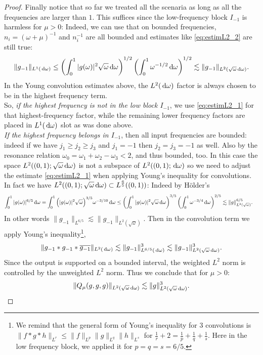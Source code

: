 \documentclass[reqno,11pt,letterpaper]{amsart}
\numberwithin{equation}{section}
\newcommand{\dd}{\, {\rm d}}
\begin{document}
\begin{proof}
Finally notice that so far we treated all the scenaria as long as all the frequencies are larger than $1$. This suffices since the low-frequency block $I_{-1}$ is harmless for $\mu>0$: Indeed, we can use that on bounded frequencies, $n_i=(\omega+\mu)^{-1}$ and $n_i^{-1}$ are all bounded and estimates like \eqref{eq:estimL2_2} are still true: 
$$
\|g_{-1}\|_{L^1(\dd\omega)} \leq \left(\int_0^1 |g(\omega)|^2\sqrt{\omega} \dd \omega\right)^{1/2}
\left(\int_0^1 \omega^{-1/2} \dd\omega\right)^{1/2}
\lesssim
\|g_{-1}\|_{L^2(\sqrt{\omega}\dd\omega)}.
$$
In the Young convolution estimates above, the $L^2(\dd\omega)$ factor is always chosen to be in the highest frequency term.\\
So, \emph{if the highest frequency is not in the low block $I_{-1}$}, we use
\eqref{eq:estimL2_1} for that highest-frequency factor, 
while the remaining lower frequency factors are placed in $L^1(\dd\omega)$ slot as was done above. \\

\emph{If the highest frequency belongs in $I_{-1}$}, then all input frequencies are bounded: indeed
 if we have $j_1\geq j_2\geq j_3$ and $j_1=-1$ then $j_2= j_3=-1$ as well. Also by the resonance relation $\omega_0= \omega_1+\omega_2-\omega_3<2$, and thus bounded, too.
 In this case the space  $L^2((0,1);\sqrt{\omega}\dd\omega)$ is not a subspace of $L^2((0,1);\dd\omega)$ so we need to adjust the estimate \eqref{eq:estimL2_1} when applying Young's inequality for convolutions.
In fact we have $L^2((0,1);\sqrt{\omega}\dd\omega) \subset L^{\frac{6}{5}}((0,1))$: Indeed by H\"{o}lder's  
\begin{align*}
\int_0^1 |g(\omega)|^{6/5}\dd\omega =\int_0^1 \Big(|g(\omega)|^2\sqrt{\omega} \Big)^{3/5}\omega^{-3/10}\dd\omega & \leq \left(\int_0^1|g(\omega)|^2\sqrt{\omega}\dd\omega\right)^{3/5}
\left(\int_0^1\omega^{-3/4}\dd\omega\right)^{2/5} \lesssim \|g\|_{L^2(\sqrt{\omega})}^{6/5}.
\end{align*} 
In other words $\|g_{-1}\|_{L^{6/5}} \lesssim \|g_{-1}\|_{L^2(\sqrt{\omega})}$. Then in the convolution term we apply Young's inequality\footnote{We remind that the general form of Young's  inequality for 3 convolutions is $\|f \ast g \ast h \|_{L^r} 
\leq 
\|f\|_{L^p} \|g\|_{L^q} \|h\|_{L^s} $ for $\frac{1}{r}+2 = \frac{1}{p} + \frac{1}{q}+ \frac{1}{s}$. Here in the low frequency block, we applied it for $p=q=s=6/5$.},
$$
\|g_{-1}*g_{-1}*\overline{ g_{-1}}\|_{L^2(\dd\omega)}
\lesssim \|g_{-1}\|_{L^{6/5}(\dd\omega)}^3
\lesssim \|g_{-1}\|_{L^2(\sqrt{\omega}\dd\omega)}^3.
$$
Since the output is supported on a bounded interval, the weighted $L^2$ norm is controlled by the unweighted $L^2$ norm.
Thus we conclude that for $\mu>0$:
$$
\|Q_\mu(g,g,g) \|_{L^2(\sqrt{\omega}\dd\omega)} \lesssim \|g\|_{L^2(\sqrt{\omega}\dd\omega)}^3. 
$$ 


\end{proof}
\end{document}
